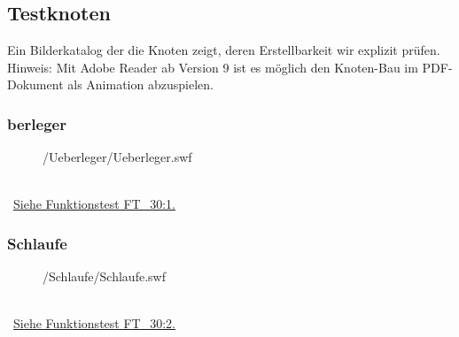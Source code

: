 %



\newpage





\subsection{Testknoten}

Ein Bilderkatalog der die Knoten zeigt, deren Erstellbarkeit wir explizit prüfen. Hinweis: Mit Adobe Reader ab Version 9 ist es möglich den Knoten-Bau im PDF-Dokument als Animation abzuspielen.\\


	\subsubsection*{berleger\grqq}
	
		\begin{figure}[!h]
		
			\label{Abb:Test-Knoten:Ueberleger}
			\centering	
			
			{\KnotMedia/Ueberleger/Ueberleger.swf}
			
		\end{figure}
		
		~\\\mousecursor~\hyperref[FT:30:Ueberleger]{Siehe Funktionstest FT\_30:1.} 
	
	

\clearpage	



	\subsubsection*{\glqq Schlaufe\grqq}	
	
		\begin{figure}[!h]
		
			\label{Abb:Test-Knoten:Schlaufe}
			\centering	
			
			{\KnotMedia/Schlaufe/Schlaufe.swf}
			
		\end{figure}
		
		~\\\mousecursor~\hyperref[FT:30:Schlaufe]{Siehe Funktionstest FT\_30:2.} 
	
	

\clearpage	


